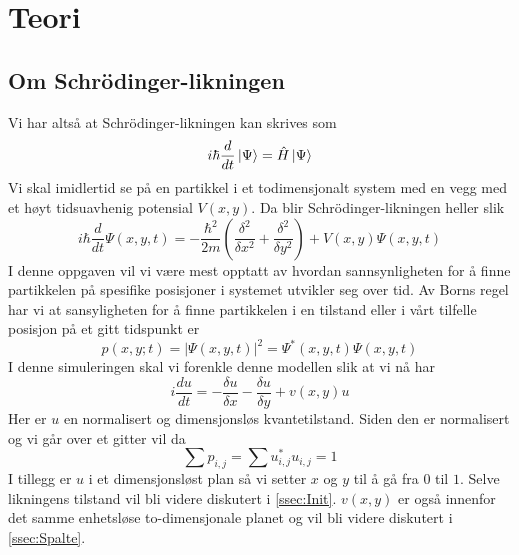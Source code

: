 \documentclass[reprint,english,notitlepage]{revtex4-2}  %
\begin{document}
\section{Teori}   %

\subsection{Om Schrödinger-likningen}
Vi har altså at Schrödinger-likningen kan skrives som
$$
i\hbar\frac{d}{dt}\ket{\Psi}=\hat{H}\ket{\Psi}
$$
Vi skal imidlertid se på en partikkel i et todimensjonalt system med en vegg med et høyt tidsuavhenig potensial $V(x,y)$. Da blir Schrödinger-likningen heller slik
$$
i\hbar \frac{d}{dt}\Psi(x,y,t)=-\frac{\hbar^2}{2m}(\frac{\delta^2}{\delta x^2}+\frac{\delta^2}{\delta y^2})+V(x,y)\Psi(x,y,t)
$$
I denne oppgaven vil vi være mest opptatt av hvordan sannsynligheten for å finne partikkelen på spesifike posisjoner i systemet utvikler seg over tid. Av Borns regel har vi at sansyligheten for å finne partikkelen i en tilstand eller i vårt tilfelle posisjon på et gitt tidspunkt er
$$
p(x,y;t)=|\Psi(x,y,t)|^2=\Psi^*(x,y,t)\Psi(x,y,t)
$$
I denne simuleringen skal vi forenkle denne modellen slik at vi nå har
$$
i\frac{d u}{dt}=-\frac{\delta u}{\delta x}-\frac{\delta u}{\delta y}+v(x,y)u
$$
Her er $u$ en normalisert og dimensjonsløs kvantetilstand. Siden den er normalisert og vi går over et gitter vil da
$$
\sum p_{i,j}=\sum u_{i,j}^*u_{i,j}=1
$$
I tillegg er $u$ i et dimensjonsløst plan så vi setter $x$ og $y$ til å gå fra $0$ til $1$. Selve likningens tilstand vil bli videre diskutert i \autoref{ssec:Init}. $v(x,y)$ er også innenfor det samme enhetsløse to-dimensjonale planet og vil bli videre diskutert i \autoref{ssec:Spalte}.
\end{document}
